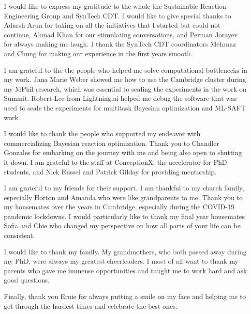 I would like to express my gratitude to the whole the Sustainable Reaction Engineering Group and SynTech CDT. I would like to give special thanks to Adarsh Arun for taking on all the initiatives that I started but could not continue, Ahmad Khan for our stimulating conversations, and Perman Jorayev for always making me laugh. I thank the SynTech CDT coordinators Mehrnaz and Chung for making our experience in the first years smooth.

I am grateful to the the people who helped me solve computational bottlenecks in my work. Jana Marie Weber showed me how to use the Cambridge cluster during my MPhil research, which was essential to scaling the experiments in the work on Summit. Robert Lee from Lightning.ai helped me debug the software that was used to scale the experiments for multitask Bayesian optimization and ML-SAFT work. 

I would like to thank the people who supported my endeavor with commercializing Bayesian reaction optimization. Thank you to  Chandler Gonzales  for embarking on the journey with me and being also open to shutting it down.  I am grateful to the staff at ConceptionX, the accelerator for PhD students, and Nick Russel and Patrick Gilday for providing mentorship.  

I am grateful to my friends for their support. I am thankful to my church family, especially Horton and Amanda who were like grandparents to me. Thank you to my housemates over the years in Cambridge, especially during the COVID-19 pandemic lockdowns. I would particularly like to thank my final year housemates Sofia and Chie who changed my perspective on how all parts of your life can be consistent. 

I would like to thank my family. My grandmothers, who both passed away during my PhD, were always my greatest cheerleaders. I most of all want to thank my parents who gave me immense opportunities and taught me to work hard and ask good questions.

Finally, thank you Ernie for always putting a smile on my face and helping me to get through the hardest times and celebrate the best ones.





